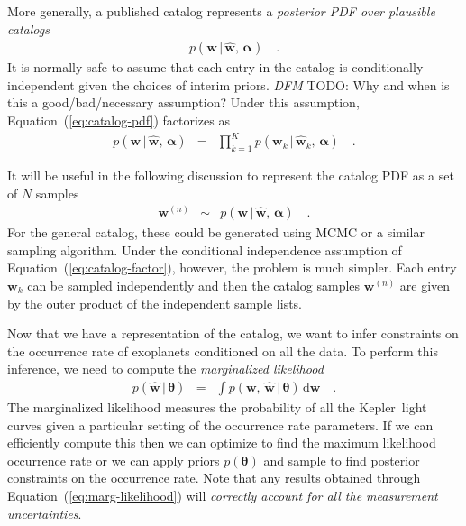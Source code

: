 \documentclass[12pt,preprint]{aastex}
\newcommand{\project}[1]{{\sffamily #1}}
\newcommand{\kepler}{\project{Kepler}}
\newcommand{\Eq}[1]{Equation~(\ref{eq:#1})}
\newcommand{\eq}[1]{\Eq{#1}}
\newcommand{\eqlabel}[1]{\label{eq:#1}}
\newcommand{\dd}{\ensuremath{\,\mathrm{d}}}
\newcommand{\bvec}[1]{\ensuremath{\boldsymbol{#1}}}
\newcommand{\todo}[3]{{\color{#2} \emph{#1} TODO: #3}}
\newcommand{\dfmtodo}[1]{\todo{DFM}{red}{#1}}
\newcommand{\ratepar}{{\ensuremath{\theta}}}
\newcommand{\ratepars}{{\ensuremath{\bvec{\ratepar}}}}
\newcommand{\obs}[1]{\ensuremath{\hat{#1}}}
\newcommand{\entry}{{\ensuremath{\bvec{w}}}}
\newcommand{\catalog}{{\ensuremath{\bvec{\entry}}}}
\newcommand{\interim}{{\ensuremath{\bvec{\alpha}}}}
\begin{document}
More generally, a published catalog represents a \emph{posterior PDF over
plausible catalogs}
\begin{eqnarray}\eqlabel{catalog-pdf}
p(\catalog\,|\,\obs{\catalog},\,\interim) \quad.
\end{eqnarray}
It is normally safe to assume that each entry in the catalog is conditionally
independent given the choices of interim priors.
\dfmtodo{Why and when is this a good/bad/necessary assumption?}
Under this assumption, \eq{catalog-pdf} factorizes as
\begin{eqnarray}\eqlabel{catalog-factor}
p(\catalog\,|\,\obs{\catalog},\,\interim) &=&
\prod_{k=1}^K p(\entry_k\,|\,\obs{\entry}_k,\,\interim) \quad.
\end{eqnarray}

It will be useful in the following discussion to represent the catalog PDF as
a set of $N$ samples
\begin{eqnarray}\eqlabel{catalog-samples}
\catalog^{(n)} &\sim& p(\catalog\,|\,\obs{\catalog},\,\interim) \quad.
\end{eqnarray}
For the general catalog, these could be generated using MCMC or a similar
sampling algorithm.
Under the conditional independence assumption of \eq{catalog-factor}, however,
the problem is much simpler.
Each entry $\entry_k$ can be sampled independently and then the catalog
samples $\catalog^{(n)}$ are given by the outer product of the independent
sample lists.

Now that we have a representation of the catalog, we want to infer constraints
on the occurrence rate of exoplanets conditioned on all the data.
To perform this inference, we need to compute the  \emph{marginalized
likelihood}
\begin{eqnarray}\eqlabel{marg-likelihood}
p(\obs{\catalog}\,|\,\ratepars) &=&
\int p(\catalog,\,\obs{\catalog}\,|\,\ratepars) \dd\catalog \quad.
\end{eqnarray}
The marginalized likelihood measures the probability of all the \kepler\ light
curves given a particular setting of the occurrence rate parameters.
If we can efficiently compute this then we can optimize to find the
maximum likelihood occurrence rate or we can apply priors $p(\ratepars)$ and
sample to find posterior constraints on the occurrence rate.
Note that any results obtained through \eq{marg-likelihood} will
\emph{correctly account for all the measurement uncertainties}.
\end{document}
